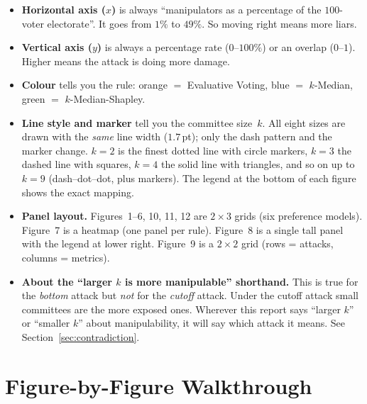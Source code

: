 \documentclass[11pt,a4paper]{article}
\begin{document}
\begin{itemize}
  \item \textbf{Horizontal axis (\(x\))} is always ``manipulators as a
        percentage of the \(100\)-voter electorate''. It goes from \(1\%\) to
        \(49\%\). So moving right means more liars.
  \item \textbf{Vertical axis (\(y\))} is always a percentage rate
        (\(0\)--\(100\%\)) or an overlap (\(0\)--\(1\)). Higher means the
        attack is doing more damage.
  \item \textbf{Colour} tells you the rule:
        \textcolor[HTML]{D55E00}{orange} \(=\) Evaluative Voting,
        \textcolor[HTML]{0072B2}{blue} \(=\) \(k\)-Median,
        \textcolor[HTML]{009E73}{green} \(=\) \(k\)-Median-Shapley.
  \item \textbf{Line style and marker} tell you the committee size~\(k\).
        All eight sizes are drawn with the \emph{same} line width
        (\(1.7\)\,pt); only the dash pattern and the marker change.
        \(k=2\) is the finest dotted line with circle markers, \(k=3\) the
        dashed line with squares, \(k=4\) the solid line with triangles, and
        so on up to \(k=9\) (dash--dot--dot, plus markers). The legend at the
        bottom of each figure shows the exact mapping.
  \item \textbf{Panel layout.} Figures~1--6, 10, 11, 12 are \(2 \times 3\)
        grids (six preference models). Figure~7 is a heatmap (one panel per
        rule). Figure~8 is a single tall panel with the legend at lower right.
        Figure~9 is a \(2 \times 2\) grid (rows = attacks, columns = metrics).
  \item \textbf{About the ``larger \(k\) is more manipulable'' shorthand.}
        This is true for the \emph{bottom} attack but \emph{not} for the
        \emph{cutoff} attack. Under the cutoff attack small committees are the
        more exposed ones. Wherever this report says ``larger \(k\)'' or
        ``smaller \(k\)'' about manipulability, it will say which attack it
        means. See Section~\ref{sec:contradiction}.
\end{itemize}

\section{Figure-by-Figure Walkthrough}
\end{document}
